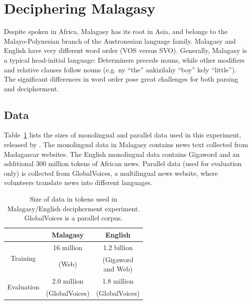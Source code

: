 \section{Deciphering Malagasy}
\label{decipher_malagasy}


Despite spoken in Africa, Malagasy has its root in Asia, and belongs to the Malayo-Polynesian branch of the Austronesian language family. Malagasy and English have very different word order (VOS versus SVO). Generally, Malagasy is a typical head-initial language: Determiners precede nouns, while other modifiers and relative clauses follow nouns (e.g. ny ``the'' ankizilahy ``boy'' kely ``little''). The significant differences in word order pose great challenges for both parsing and decipherment.


\subsection{Data}

Table~\ref{mlg-en-data} lists the sizes of monolingual and parallel data used in this experiment, released by . The monolingual data in Malagasy contains news text collected from Madagascar websites. The English monolingual data contains Gigaword and an additional 300 million tokens of African news. Parallel data (used for evaluation only) is collected from GlobalVoices, a multilingual news website, where volunteers translate news into different languages.

 \begin{table}
 \begin{center}
 \begin{tabular}{ |c|c|c| } \hline
             & Malagasy & English \\ \hline
\multirow{2}{*}{Training} & 16 million & 1.2 billion\\ 
& (Web) & \pbox{2cm}{ (Gigaword \\ and Web)}  \\ \hline
\multirow{2}{*}{Evaluation} & 2.0 million& 1.8 million \\
 & (GlobalVoices) & (GlobalVoices)  \\ \hline
 \end{tabular}
 \caption{Size of data in tokens used in Malagasy/English decipherment experiment. GlobalVoices is a parallel corpus.}
 \label{mlg-en-data}
 \end{center}
 \end{table}
 
